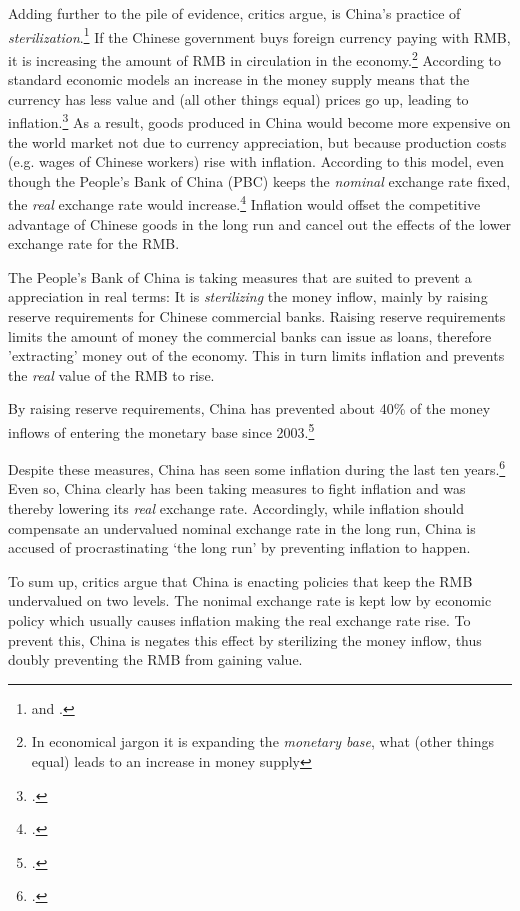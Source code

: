 Adding further to the pile of evidence, critics argue, is China's 
practice of \emph{sterilization}.\footnote{\cite{Humpage2010} and \cite[p. ?]{Wang2011}.} If the Chinese government buys foreign 
currency paying with RMB, it is increasing the amount of RMB in 
circulation in the economy.\footnote{In economical jargon it is 
expanding the \emph{monetary base}, what (other things equal) leads to 
an increase in money supply} According to standard economic models an 
increase in the money supply means that the currency has less value and 
(all other things equal) prices go up, leading to 
inflation.\footnote{\cite[pp. 432]{Krugman2008}.}
As a result, goods produced in China would become more expensive on the 
world market not due to currency appreciation, but because production 
costs (e.g. wages of Chinese workers) rise with inflation. According to 
this model, even though the People's Bank of China (PBC) keeps the 
\emph{nominal} exchange rate fixed, the \emph{real} exchange rate would 
increase.\footnote{\cite[p. 509]{Krugman2008}.} Inflation would offset the 
competitive advantage of Chinese goods in the long run and cancel out 
the effects of the lower exchange rate for the RMB.

The People's Bank of China is taking measures that are suited to prevent 
a appreciation in real terms: It is \emph{sterilizing} the money inflow, 
mainly by raising reserve requirements for Chinese commercial banks.  
Raising reserve requirements limits the amount of money the commercial 
banks can issue as loans, therefore 'extracting' money out of the 
economy. This in turn limits inflation and prevents the \emph{real} 
value of the RMB to rise. 

By raising reserve requirements, China has prevented about 40\% of the money 
inflows of entering the monetary base since 2003.\footnote{\cite{Humpage2010}.}%

Despite these measures, China has seen some inflation during the last 
ten years.\footnote{\cite{Humpage2010}.} Even so, China clearly has been 
taking measures to fight inflation and was thereby lowering its 
\emph{real} exchange rate. Accordingly, while inflation should 
compensate an undervalued nominal exchange rate in the long run, China 
is accused of procrastinating `the long run' by preventing inflation to 
happen.

To sum up, critics argue that China is enacting policies that keep the 
RMB undervalued on two levels. The nonimal exchange rate is kept low by 
economic policy which usually causes inflation making the real exchange 
rate rise. To prevent this, China is negates this effect by sterilizing 
the money inflow, thus doubly preventing the RMB from gaining value.

